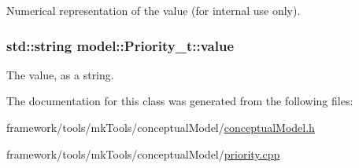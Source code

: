 Numerical representation of the value (for internal use only). 

\subsubsection[{\texorpdfstring{value}{value}}]{\setlength{\rightskip}{0pt plus 5cm}std\+::string model\+::\+Priority\+\_\+t\+::value\hspace{0.3cm}{\ttfamily [protected]}}\hypertarget{classmodel_1_1_priority__t_ae8093c08ba694dd16cd3b64c1d9610c9}{}\label{classmodel_1_1_priority__t_ae8093c08ba694dd16cd3b64c1d9610c9}


The value, as a string. 



The documentation for this class was generated from the following files\+:\begin{DoxyCompactItemize}
\item 
framework/tools/mk\+Tools/conceptual\+Model/\hyperlink{conceptual_model_8h}{conceptual\+Model.\+h}\item 
framework/tools/mk\+Tools/conceptual\+Model/\hyperlink{priority_8cpp}{priority.\+cpp}\end{DoxyCompactItemize}
